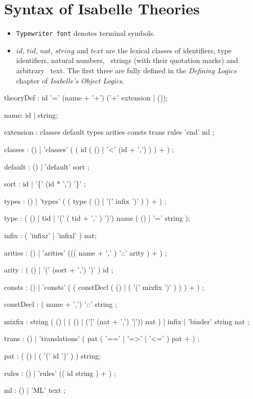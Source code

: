 
\appendix
{}  %

\chapter{Syntax of Isabelle Theories}\label{app:TheorySyntax}
\begin{itemize}
\item {\tt Typewriter font} denotes terminal symbols.
\item $id$, $tid$, $nat$, $string$ and $text$ are the lexical classes of
  identifiers, type identifiers, natural numbers, \ML\ strings (with their
  quotation marks) and arbitrary \ML\ text.  The first three are fully defined
  in the {\it Defining Logics} chapter of {\it Isabelle's Object Logics}.
\end{itemize}

\begin{rail}

theoryDef : id '=' (name + '+') ('+' extension | ());

name: id | string;

extension : classes default types arities consts trans rules 'end' ml
          ;

classes : ()
        | 'classes' ( ( id (  ()
                            | '<' (id + ',')
                           ) 
                       ) + )
        ;

default : ()
        | 'default' sort 
        ;

sort :  id
     | '\{' (id * ',') '\}'
     ;

types :  ()
      | 'types' ( ( type ( () | '(' infix ')' ) ) + )
      ;

type : ( () | tid | '(' ( tid + ',' ) ')') name ( () | '='  string );

infix : ( 'infixr' | 'infixl' ) nat;


arities :  ()
        | 'arities' ((( name + ',' ) '::' arity ) + )
        ;

arity   : ( () 
          | '(' (sort + ',') ')' 
          ) id
        ;


consts :  ()
       | 'consts' ( ( constDecl ( () | ( '(' mixfix ')' ) ) ) + )
       ;

constDecl : ( name + ',') '::' string ;


mixfix :  string ( () | ( () | ('[' (nat + ',') ']')) nat )
       | infix
       | 'binder' string nat ;

trans : ()
      | 'translations' ( pat ( '==' | '=>' | '<=' ) pat + )
      ;

pat : ( () | ( '(' id ')' ) ) string;

rules :  ()
      | 'rules' (( id string ) + )
      ;

ml :  ()
   | 'ML' text
   ;

\end{rail}

